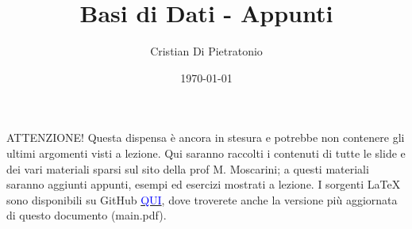 \documentclass[a4paper,10pt]{article}
\title{\Huge Basi di Dati - Appunti}
\author{Cristian Di Pietratonio}
\date{\today}
\begin{document}
\maketitle

ATTENZIONE! Questa dispensa è ancora in stesura e potrebbe non contenere gli ultimi argomenti visti 
a lezione. Qui saranno raccolti i contenuti di tutte le slide e dei vari materiali sparsi sul sito
della prof M. Moscarini; a questi materiali saranno aggiunti appunti, esempi ed esercizi mostrati a
lezione. I sorgenti LaTeX sono disponibili su GitHub 
\href{https://github.com/Halolegend94/uni_database_appunti}{\textcolor{blue}{QUI}}, dove troverete 
anche la versione più aggiornata di questo documento (main.pdf).

\newpage
\setcounter{tocdepth}{3}
\tableofcontents
\newpage

\newpage

\newpage

\newpage

\newpage

\end{document}
